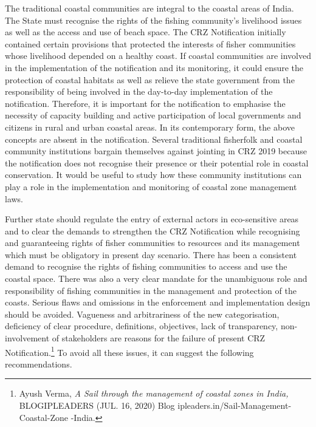 \begin{multicols}{2}

\noi
The traditional coastal communities are integral to the coastal areas of India. The State must
recognise the rights of the fishing community’s livelihood issues as well as the access and use
of beach space. The CRZ Notification initially contained certain provisions that protected the
interests of fisher communities whose livelihood depended on a healthy coast. If coastal
communities are involved in the implementation of the notification and its monitoring, it
could ensure the protection of coastal habitats as well as relieve the state government from
the responsibility of being involved in the day-to-day implementation of the notification.
Therefore, it is important for the notification to emphasise the necessity of capacity building
and active participation of local governments and citizens in rural and urban coastal areas. In
its contemporary form, the above concepts are absent in the notification. Several traditional
fisherfolk and coastal community institutions bargain themselves against jointing in CRZ
2019 because the notification does not recognise their presence or their potential role in
coastal conservation. It would be useful to study how these community institutions can play a
role in the implementation and monitoring of coastal zone management laws.

\noi
Further state should regulate the entry of external actors in eco-sensitive areas and to clear the
demands to strengthen the CRZ Notification while recognising and guaranteeing rights of
fisher communities to resources and its management which must be obligatory in present day
scenario. There has been a consistent demand to recognise the rights of fishing communities
to access and use the coastal space. There was also a very clear mandate for the unambiguous
role and responsibility of fishing communities in the management and protection of the
coasts. Serious flaws and omissions in the enforcement and implementation design should be
avoided. Vagueness and arbitrariness of the new categorisation, deficiency of clear
procedure, definitions, objectives, lack of transparency, non-involvement of stakeholders are
reasons for the failure of present CRZ Notification.\footnote{ Ayush Verma, \textit{A Sail through the management of coastal zones in India,} BLOGIPLEADERS (JUL. 16, 2020)
Blog ipleaders.in/Sail-Management-Coastal-Zone -India.} To avoid all these issues, it can suggest
the following recommendations.



\end{multicols}
